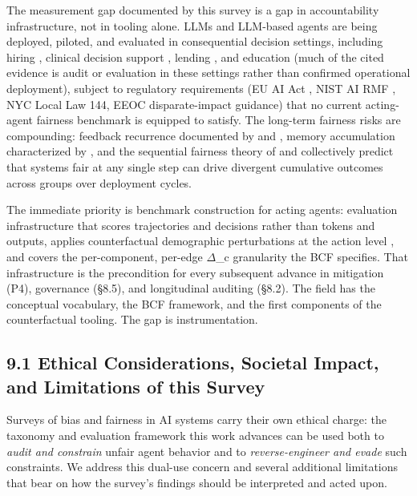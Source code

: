 \documentclass[10pt]{article}
\begin{document}
The measurement gap documented by this survey is a gap in accountability infrastructure, not in tooling alone. LLMs and LLM-based agents are being deployed, piloted, and evaluated in consequential decision settings, including hiring \cite{veldanda2023emily,wilson2024gender,nghiem2024you}, clinical decision support \cite{poulain2024bias,omar2025sociodemographic}, lending \cite{bowen2024measuring,feng2023empowering}, and education \cite{weissburg2024llms} (much of the cited evidence is audit or evaluation in these settings rather than confirmed operational deployment), subject to regulatory requirements (EU AI Act \cite{parliament2024regulation}, NIST AI RMF \cite{nist2023artificial}, NYC Local Law 144, EEOC disparate-impact guidance) that no current acting-agent fairness benchmark is equipped to satisfy. The long-term fairness risks are compounding: feedback recurrence documented by \cite{wyllie2024fairness} and \cite{wang2026observations}, memory accumulation characterized by \cite{ma2026implicit}, and the sequential fairness theory of \cite{hu2022achieving} and \cite{xu2024adapting} collectively predict that systems fair at any single step can drive divergent cumulative outcomes across groups over deployment cycles.

The immediate priority is benchmark construction for acting agents: evaluation infrastructure that scores trajectories and decisions rather than tokens and outputs, applies counterfactual demographic perturbations at the action level \cite{parziale2025systematic,amirimargavi2026equal,basu2026names}, and covers the per-component, per-edge $\Delta$\_c granularity the BCF specifies. That infrastructure is the precondition for every subsequent advance in mitigation (P4), governance (\S{}8.5), and longitudinal auditing (\S{}8.2). The field has the conceptual vocabulary, the BCF framework, and the first components of the counterfactual tooling. The gap is instrumentation.


\subsection*{9.1 Ethical Considerations, Societal Impact, and Limitations of this Survey}

Surveys of bias and fairness in AI systems carry their own ethical charge: the taxonomy and evaluation framework this work advances can be used both to \emph{audit and constrain} unfair agent behavior and to \emph{reverse-engineer and evade} such constraints. We address this dual-use concern and several additional limitations that bear on how the survey's findings should be interpreted and acted upon.
\end{document}

